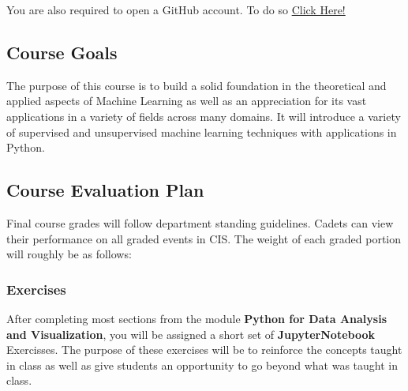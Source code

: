 \documentclass[11pt]{article}
\theoremstyle{plain}
\theoremstyle{definition}
\begin{document}
You are also required to open a GitHub account. To do so \href{https://github.com/}{Click Here!}

\subsection{Course Goals}

The purpose of this course is to build a solid foundation in the theoretical and applied aspects of Machine Learning as well as an appreciation for its vast applications in a variety of fields across many domains. It will introduce a variety of supervised and unsupervised machine learning techniques with applications in Python.

\subsection{Course Evaluation Plan}

Final course grades will follow department standing guidelines. Cadets can view their performance on all graded events in CIS. 
\vskip 8pt
The weight of each graded portion will roughly be as follows:


\begin{table}[!h]
\begin{center}
\end{center}
\end{table}

\subsubsection{Exercises}

After completing most sections from the module {\bf Python for Data Analysis and Visualization}, you will be assigned a short set of {\bf JupyterNotebook} Exercisses. The purpose of these exercises will be to reinforce the concepts taught in class as well as give students an opportunity to go beyond what was taught in class. 
\end{document}
